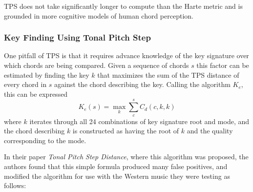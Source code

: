 TPS does not take significantly longer to compute than the Harte metric and is grounded in more cognitive models of human chord perception.

\subsubsection{Key Finding Using Tonal Pitch Step}

One pitfall of TPS is that it requires advance knowledge of the key signature over which chords are being compared. Given a sequence of chords $s$ this factor can be estimated by finding the key $k$ that maximizes the sum of the TPS distance of every chord in $s$ against the chord describing the key. Calling the algorithm $K_e$, this can be expressed \[ K_e(s) = \max_k \sum_c^s C_d(c,k,k) \] where $k$ iterates through all 24 combinations of key signature root and mode, and the chord describing $k$ is constructed as having the root of $k$ and the quality corresponding to the mode.

In their paper \textit{Tonal Pitch Step Distance}\cite{de2008tonal}, where this algorithm was proposed, the authors found that this simple formula produced many false positives, and modified the algorithm for use with the Western music they were testing as follows:

